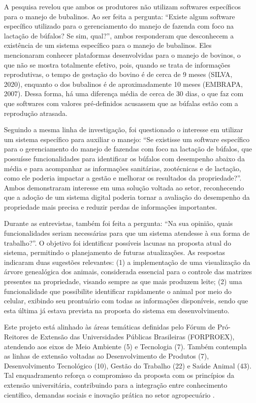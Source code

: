 A pesquisa revelou que ambos os produtores não utilizam softwares específicos para o manejo de bubalinos. Ao ser feita a pergunta: “Existe algum software específico utilizado para o gerenciamento do manejo de fazenda com foco na lactação de búfalos? Se sim, qual?”, ambos responderam que desconhecem a existência de um sistema específico para o manejo de bubalinos. Eles mencionaram conhecer plataformas desenvolvidas para o manejo de bovinos, o que não se mostra totalmente efetivo, pois, quando se trata de informações reprodutivas, o tempo de gestação do bovino é de cerca de 9 meses (SILVA, 2020), enquanto o dos bubalinos é de aproximadamente 10 meses (EMBRAPA, 2007). Dessa forma, há uma diferença média de cerca de 30 dias, o que faz com que softwares com valores pré-definidos acusassem que as búfalas estão com a reprodução atrasada.

Seguindo a mesma linha de investigação, foi questionado o interesse em utilizar um sistema específico para auxiliar o manejo: “Se existisse um software específico para o gerenciamento do manejo de fazendas com foco na lactação de búfalos, que possuísse funcionalidades para identificar os búfalos com desempenho abaixo da média e para acompanhar as informações sanitárias, zootécnicas e de lactação, como ele poderia impactar a gestão e melhorar os resultados da propriedade?”. Ambos demonstraram interesse em uma solução voltada ao setor, reconhecendo que a adoção de um sistema digital poderia tornar a avaliação do desempenho da propriedade mais precisa e reduzir perdas de informações importantes.

Durante as entrevistas, também foi feita a pergunta: “Na sua opinião, quais funcionalidades seriam necessárias para que um sistema atendesse à sua forma de trabalho?”. O objetivo foi identificar possíveis lacunas na proposta atual do sistema, permitindo o planejamento de futuras atualizações. As respostas indicaram duas sugestões relevantes: (1) a implementação de uma visualização da árvore genealógica dos animais, considerada essencial para o controle das matrizes presentes na propriedade, visando sempre as que mais produzem leite; (2) uma funcionalidade que possibilite identificar rapidamente o animal por meio do celular, exibindo seu prontuário com todas as informações disponíveis, sendo que esta última já estava prevista na proposta do sistema em desenvolvimento.

Este projeto está alinhado às áreas temáticas definidas pelo Fórum de Pró-Reitores de Extensão das Universidades Públicas Brasileiras (FORPROEX), atendendo aos eixos de Meio Ambiente (5) e Tecnologia (7). Também contempla as linhas de extensão voltadas ao Desenvolvimento de Produtos (7), Desenvolvimento Tecnológico (10), Gestão do Trabalho (22) e Saúde Animal (43). Tal enquadramento reforça o compromisso da proposta com os princípios da extensão universitária, contribuindo para a integração entre conhecimento científico, demandas sociais e inovação prática no setor agropecuário \cite{FORPROEX}.